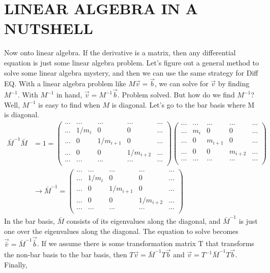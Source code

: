 \documentclass[12pt]{article}
\begin{document}
\section{LINEAR ALGEBRA IN A NUTSHELL}
Now onto linear algebra. If the derivative is a matrix, then any differential equation is just some linear algebra problem. Let's figure out a general method to solve some linear algebra mystery, and then we can use the same strategy for Diff EQ. With a linear algebra problem like $M\vec{v} = \vec{b}$, we can solve for $\vec{v}$ by finding $M^{-1}$. With $M^{-1}$ in hand, $\vec{v} = M^{-1}\vec{b}$. Problem solved. But how do we find $M^{-1}$? Well, $M^{-1}$ is easy to find when $M$ is diagonal. Let's go to the bar basis where M is diagonal.
\begin{equation}
\label{minv}
\begin{split}
\bar{M}^{-1}\bar{M} &= 1 = 
\begin{pmatrix}
... & ... & ... & ... & ... \\
... & 1/m_i & 0 & 0 & ... \\
... & 0 & 1/m_{i+1} & 0 & ... \\
... & 0 & 0 & 1/m_{i+2} & ... \\
... & ... & ... & ... & ... \\
\end{pmatrix}
\begin{pmatrix}
... & ... & ... & ... & ... \\
... & m_i & 0 & 0 & ... \\
... & 0 & m_{i+1} & 0 & ... \\
... & 0 & 0 & m_{i+2} & ... \\
... & ... & ... & ... & ... \\
\end{pmatrix} \\
&\rightarrow \bar{M}^{-1} =  
\begin{pmatrix}
... & ... & ... & ... & ... \\
... & 1/m_i & 0 & 0 & ... \\
... & 0 & 1/m_{i+1} & 0 & ... \\
... & 0 & 0 & 1/m_{i+2} & ... \\
... & ... & ... & ... & ... \\
\end{pmatrix}
\end{split}
\end{equation}
In the bar basis, $\bar{M}$ consists of its eigenvalues along the diagonal, and $\bar{M}^{-1}$ is just one over the eigenvalues along the diagonal. The equation to solve becomes $\vec{\bar{v}} = \bar{M}^{-1}\vec{\bar{b}}$. If we assume there is some transformation matrix T that transforms the non-bar basis to the bar basis, then $T\vec{v} = \bar{M}^{-1}T\vec{b}$ and $\vec{v} = T^{-1}\bar{M}^{-1}T\vec{b}$. Finally, 
\end{document}
